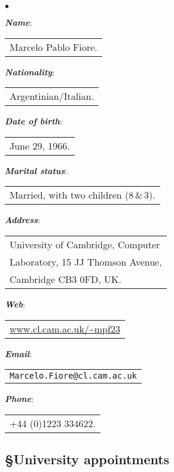\documentclass[11pt,twocolumn]{article}
\newenvironment{myitemize}
  {\begin{list}{$\bullet$}
  {\setlength{\topsep}{1pt}
   \setlength{\partopsep}{1pt}
   \setlength{\itemsep}{0pt}
   \setlength{\parsep}{0pt}
   \setlength{\leftmargin}{1em}
   \setlength{\labelwidth}{.5em}}}
  {\end{list}}
\begin{document}
\begin{myitemize}
\item
\textbf{\em Name}: 
\begin{tabular}[t]{l}
  Marcelo Pablo Fiore.
\end{tabular}

\item
\textbf{\em Nationality}: 
\begin{tabular}[t]{l}
  Argentinian/Italian.
\end{tabular}

\item
\textbf{\em Date of birth}: 
\begin{tabular}[t]{l}
  June 29, 1966.
\end{tabular}

\item
\textbf{\em Marital status}: 
\begin{tabular}[t]{l}
  Married, with two children (8\,\&\,3).
\end{tabular}

\item
\textbf{\em Address}: 
\begin{tabular}[t]{l}
  University of Cambridge, 
  Computer\\ Laboratory, 15 JJ Thomson
  Avenue,\\ Cambridge CB3 0FD, UK.
\end{tabular}

\item
\textbf{\em Web}: 
\begin{tabular}[t]{l}\small
  \url{www.cl.cam.ac.uk/~mpf23}
\end{tabular}

\item
\textbf{\em Email}: 
\begin{tabular}[t]{l}\small
  \texttt{Marcelo.Fiore@cl.cam.ac.uk}
\end{tabular}

\item
\textbf{\em Phone}: 
\begin{tabular}[t]{l}
  +44 (0)1223 334622.
\end{tabular}
\end{myitemize}

\subsection*{\S\enspace\thinspace University appointments}
\end{document}
